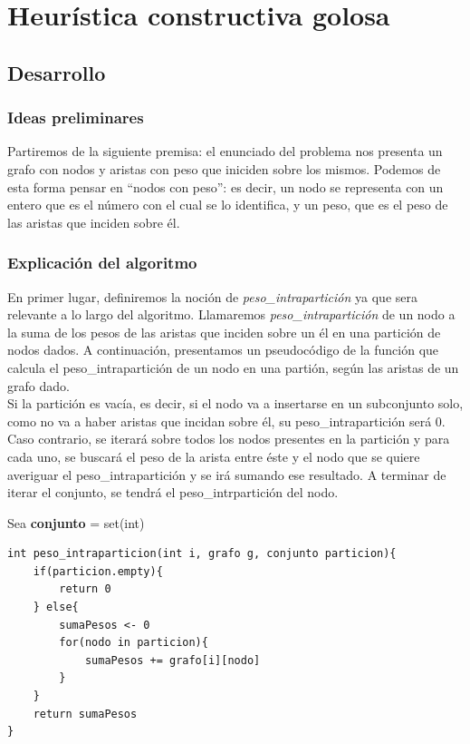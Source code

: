 \documentclass[10pt,a4paper]{article}
\begin{document}
\section{Heurística constructiva golosa}
\subsection{Desarrollo}
\subsubsection{Ideas preliminares}

Partiremos de la siguiente premisa: el enunciado del problema nos presenta un grafo con nodos y aristas con peso que iniciden sobre los mismos. Podemos de esta forma pensar en ``nodos con peso'': es decir, un nodo se representa con un entero que es el número con el cual se lo identifica, y un peso, que es el peso de las aristas que inciden sobre él.


\subsubsection{Explicación del algoritmo}

En primer lugar, definiremos la noción de \textit{peso\_intrapartición} ya que sera relevante a lo largo del algoritmo. 
Llamaremos \textit{peso\_intrapartición} de un nodo a la suma de los pesos de las aristas que inciden sobre un él en una partición de nodos dados.
A continuación, presentamos un pseudocódigo de la función que calcula el peso\_intrapartición de un nodo en una partión, según las aristas de un grafo dado.\\
Si la partición es vacía, es decir, si el nodo va a insertarse en un subconjunto solo, como no va a haber aristas que incidan sobre él, su peso\_intrapartición será 0.\\
Caso contrario, se iterará sobre todos los nodos presentes en la partición y para cada uno, se buscará el peso de la arista entre éste y el nodo que se quiere averiguar el peso\_intrapartición y se irá sumando ese resultado. A terminar de iterar el conjunto, se tendrá el peso\_intrpartición del nodo.

Sea \textbf{conjunto} = set(int)

\begin{lstlisting}
int peso_intraparticion(int i, grafo g, conjunto particion){
	if(particion.empty){
		return 0
	} else{
		sumaPesos <- 0
		for(nodo in particion){
			sumaPesos += grafo[i][nodo]
		}
	}
	return sumaPesos
}
\end{lstlisting}
\end{document}
